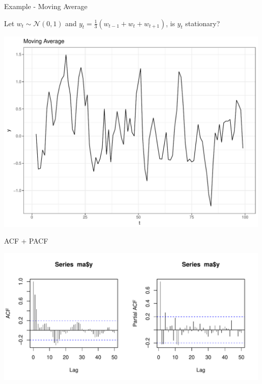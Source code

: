 \documentclass[11pt,ignorenonframetext,]{beamer}
\begin{document}
\begin{frame}{Example - Moving Average}

Let \(w_t \sim \mathcal{N}(0,1)\) and
\(y_t = \frac{1}{3}\left(w_{t-1}+w_t+w_{t+1}\right)\), is \(y_t\)
stationary?

\includegraphics{Lec6_files/figure-beamer/unnamed-chunk-5-1.pdf}

\end{frame}

\begin{frame}{ACF + PACF}

\includegraphics{Lec6_files/figure-beamer/unnamed-chunk-6-1.pdf}

\end{frame}
\end{document}
